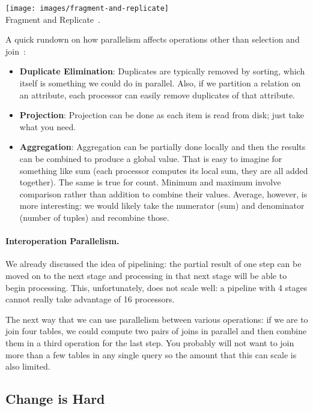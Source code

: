\documentclass[a4paper]{report}
\begin{document}
\begin{center}
\texttt{[image: images/fragment-and-replicate]}\\
Fragment and Replicate~\cite{dsc}.
\end{center}

A quick rundown on how parallelism affects operations other than selection and join~\cite{dsc}:
\begin{itemize}
\item \textbf{Duplicate Elimination}: Duplicates are typically removed by sorting, which itself is something we could do in parallel. Also, if we partition a relation on an attribute, each processor can easily remove duplicates of that attribute.
\item \textbf{Projection}: Projection can be done as each item is read from disk; just take what you need.
\item \textbf{Aggregation}: Aggregation can be partially done locally and then the results can be combined to produce a global value. That is easy to imagine for something like sum (each processor computes its local sum, they are all added together). The same is true for count. Minimum and maximum involve comparison rather than addition to combine their values. Average, however, is more interesting: we would likely take the numerator (sum) and denominator (number of tuples) and recombine those.

\end{itemize}

\paragraph{Interoperation Parallelism.}

We already discussed the idea of pipelining: the partial result of one step can be moved on to the next stage and processing in that next stage will be able to begin processing. This, unfortunately, does not scale well: a pipeline with 4 stages cannot really take advantage of 16 processors.

The next way that we can use parallelism between various operations: if we are to join four tables, we could compute two pairs of joins in parallel and then combine them in a third operation for the last step. You probably will not want to join more than a few tables in any single query so the amount that this can scale is also limited.

\subsection*{Change is Hard}
\end{document}
